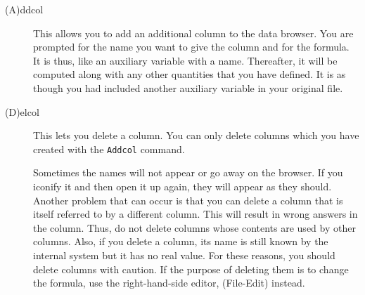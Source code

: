 \documentclass{article}
\begin{document}
\begin{description}
\item[(A)ddcol]  This allows you to add an additional column to the
data browser.  You are prompted for the name you want to give the
column and for the formula.  It is thus, like an auxiliary variable
with a name.  Thereafter, it will be computed along with any other
quantities that you have defined.  It is as though you had included
another auxiliary variable in your original file.
\item[(D)elcol]  This lets you delete a column.  You can only delete
columns which you have created with the {\tt Addcol} command. 

Sometimes the names will not appear or  go away on the browser.  
If you iconify it
and then open it up again, they will appear as they should.  Another
problem that can occur is that you can delete a column that is itself
referred to by a different column.  This will result in wrong answers
in the column. Thus, do not delete columns whose contents are used by
other columns.  Also, if you delete a column, its name is still known
by the internal system but it has no real value. For these reasons,
you should delete columns with caution.  If the purpose of deleting
them is to change the formula, use the right-hand-side editor,
(File-Edit) instead.



\end{description}

 
\end{document}
